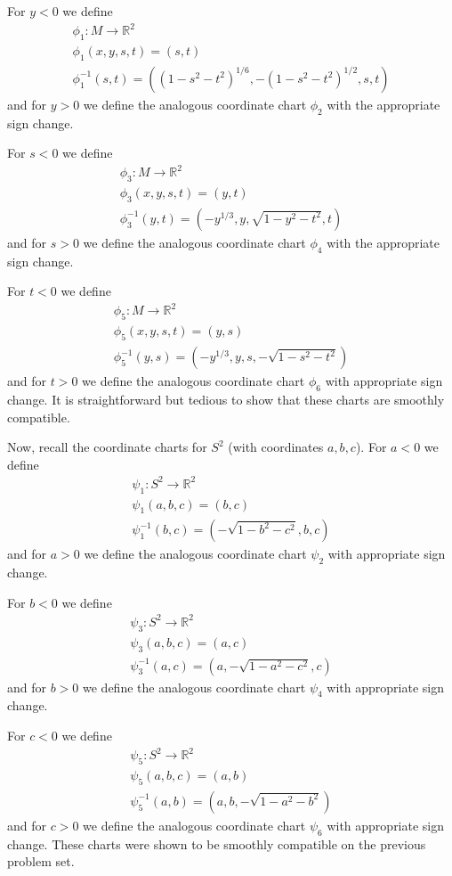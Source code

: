 \documentclass{../../mathnotes}
\begin{document}
For $y<0$ we define
\begin{align*}
    \phi_1:M\to\mathbb{R}^2\\
    \phi_1(x,y,s,t)=(s,t)\\
    \phi_1^{-1}(s,t)=\left( (1-s^2-t^2)^{1/6},-(1-s^2-t^2)^{1/2},s,t \right)
\end{align*}
and for $y>0$ we define the analogous coordinate chart $\phi_2$ with the appropriate sign change.

For $s<0$ we define
\begin{align*}
    \phi_3:M\to\mathbb{R}^2\\
    \phi_3(x,y,s,t)=(y,t)\\
    \phi_3^{-1}(y,t)=\left( -y^{1/3},y,\sqrt{1-y^2-t^2},t \right)
\end{align*}
and for $s>0$ we define the analogous coordinate chart $\phi_4$ with the appropriate sign change.

For $t<0$ we define
\begin{align*}
    \phi_5:M\to\mathbb{R}^2\\
    \phi_5(x,y,s,t)=(y,s)\\
    \phi_5^{-1}(y,s)=\left( -y^{1/3},y,s,-\sqrt{1-s^2-t^2} \right)
\end{align*}
and for $t>0$ we define the analogous coordinate chart $\phi_6$ with appropriate sign change. It is straightforward but tedious to show
that these charts are smoothly compatible.

Now, recall the coordinate charts for $S^2$ (with coordinates $a,b,c$). For $a<0$ we define
\begin{align*}
    \psi_1:S^2\to\mathbb{R}^2\\
    \psi_1(a,b,c)=(b,c)\\
    \psi_1^{-1}(b,c)=\left( -\sqrt{1-b^2-c^2},b,c \right)
\end{align*}
and for $a>0$ we define the analogous coordinate chart $\psi_2$ with appropriate sign change.

For $b<0$ we define
\begin{align*}
    \psi_3:S^2\to\mathbb{R}^2\\
    \psi_3(a,b,c)=(a,c)\\
    \psi_3^{-1}(a,c)=\left(a, -\sqrt{1-a^2-c^2},c \right)
\end{align*}
and for $b>0$ we define the analogous coordinate chart $\psi_4$ with appropriate sign change.

For $c<0$ we define
\begin{align*}
    \psi_5:S^2\to\mathbb{R}^2\\
    \psi_5(a,b,c)=(a,b)\\
    \psi_5^{-1}(a,b)=\left( a,b,-\sqrt{1-a^2-b^2} \right)
\end{align*}
and for $c>0$ we define the analogous coordinate chart $\psi_6$ with appropriate sign change. These charts were shown to be smoothly compatible on
the previous problem set.
\end{document}
